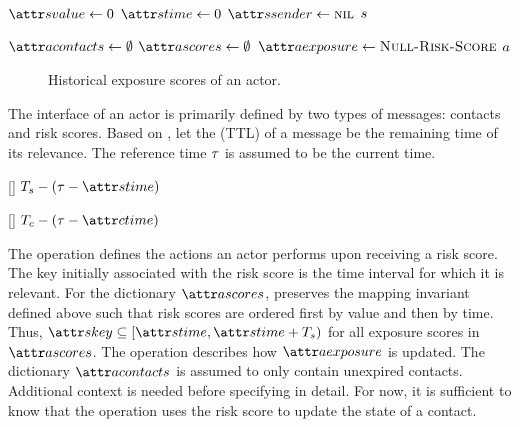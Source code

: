 \begin{function}[H]{\nNullRiskScore}
  \State $\aScoreValue \assign 0$
  \State $\aScoreTime \assign 0$
  \State $\aScoreSender \assign \nil$
  \State \Return $s$
\end{function}

\begin{function}[H]{\nCreateActor}
  \State $\aActorContacts \assign \emptyset$
  \State $\aActorScores \assign \emptyset$
  \State $\aActorExposure \assign \cNullRiskScore$
  \State \Return $a$
\end{function}

\begin{figure}[htb]
\centering
{}
\caption[Historical exposure scores of an actor]{Historical exposure scores of an actor.}
\label{fig:exposure}
\end{figure}


The interface of an actor is primarily defined by two types of messages: contacts and risk scores. Based on , let the  (TTL) of a message be the remaining time of its relevance. The reference time $\tau$ is assumed to be the current time.

\begin{function}{\nRiskScoreTtl}[\vScore]
  \State \Return $\pScoreExpiry - (\vRefTime - \aScoreTime)$
\end{function}

\begin{function}{\nContactTtl}[\vContact]
  \State \Return $\pContactExpiry - (\vRefTime - \aContactTime)$
\end{function}

The \cHandleRiskScore{} operation defines the actions an actor performs upon receiving a risk score. The key initially associated with the risk score is the time interval for which it is relevant. For the dictionary $\aActorScores$, \cMerge{} preserves the mapping invariant defined above such that risk scores are ordered first by value and then by time. Thus, $\aScoreKey \subseteq [\aScoreTime, \aScoreTime + \pScoreExpiry)$ for all exposure scores in $\aActorScores$. The \cUpdateExposureScore{} operation describes how $\aActorExposure$ is updated. The dictionary $\aActorContacts$ is assumed to only contain unexpired contacts. Additional context is needed before specifying \cApplyRiskScore{} in detail. For now, it is sufficient to know that the operation uses the risk score to update the state of a contact.

